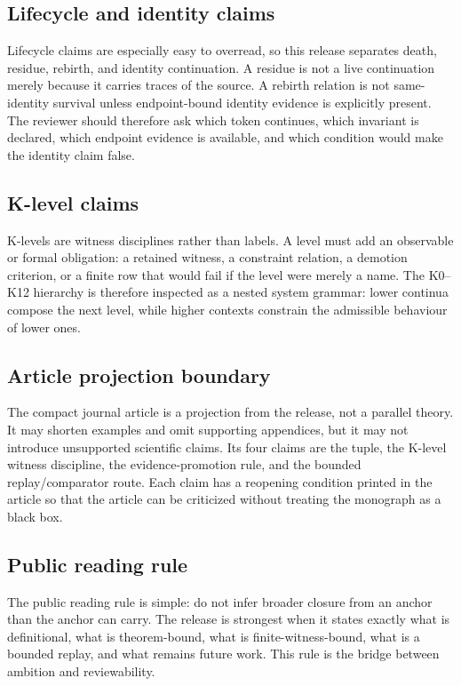 \subsection{Lifecycle and identity claims}

Lifecycle claims are especially easy to overread, so this release separates
death, residue, rebirth, and identity continuation. A residue is not a live
continuation merely because it carries traces of the source. A rebirth relation
is not same-identity survival unless endpoint-bound identity evidence is
explicitly present. The reviewer should therefore ask which token continues,
which invariant is declared, which endpoint evidence is available, and which
condition would make the identity claim false.

\subsection{K-level claims}

K-levels are witness disciplines rather than labels. A level must add an
observable or formal obligation: a retained witness, a constraint relation, a
demotion criterion, or a finite row that would fail if the level were merely a
name. The K0--K12 hierarchy is therefore inspected as a nested system grammar:
lower continua compose the next level, while higher contexts constrain the
admissible behaviour of lower ones.

\subsection{Article projection boundary}

The compact journal article is a projection from the release, not a parallel
theory. It may shorten examples and omit supporting appendices, but it may not
introduce unsupported scientific claims. Its four claims are the tuple, the
K-level witness discipline, the evidence-promotion rule, and the bounded
replay/comparator route. Each claim has a reopening condition printed in the
article so that the article can be criticized without treating the monograph as
a black box.

\subsection{Public reading rule}

The public reading rule is simple: do not infer broader closure from an anchor
than the anchor can carry. The release is strongest when it states exactly what
is definitional, what is theorem-bound, what is finite-witness-bound, what is a
bounded replay, and what remains future work. This rule is the bridge between
ambition and reviewability.

